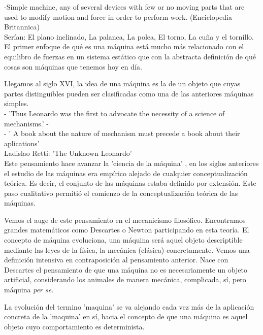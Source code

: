 -Simple machine, any of several devices with few or no moving parts that are used to modify motion and force in order to perform work. (Enciclopedia Britannica) \\


Serían: El plano inclinado, La palanca, La polea, El torno, La cuña y el tornillo. El primer enfoque de qué es una máquina está mucho más relacionado con el equilibro de fuerzas en un sistema estático que con la abstracta definición de qué cosas son máquinas que tenemos hoy en día. 

\vspace{10px}

Llegamos al siglo XVI, la idea de una máquina es la de un objeto que cuyas partes distinguibles pueden ser clasificadas como una de las anteriores máquinas simples. \\

- 'Thus Leonardo was the first to advocate the necessity of a science of mechanisms.' -  \\

- ' A book about the nature of mechanism must precede a book about their aplications' \\

Ladislao Retti: 'The Unknown Leonardo' \\

Este pensamiento hace avanzar la 'ciencia de la máquina' , en los siglos anteriores el estudio de las máquinas era empírico alejado de cualquier conceptualización teórica. Es decir, el conjunto de las máquinas estaba definido por extensión. Este paso cualitativo permitió el comienzo de la conceptualización teórica de las máquinas.

\vspace{10px}

Vemos el auge de este pensamiento en el mecanicismo filosófico. Encontramos grandes matemáticos como Descartes o Newton participando en esta teoría. El concepto de máquina evoluciona, una máquina será aquel objeto descriptible mediante las leyes de la física, la mecánica (clásica) concretamente. Vemos una definición intensiva en contraposición al pensamiento anterior. Nace con Descartes el pensamiento de que una máquina no es necesariamente un objeto artificial, considerando los animales de manera mecánica, complicada, sí, pero máquina \textit{per se}. 


La evolución del termino 'maquina' se va alejando cada vez más de la aplicación concreta de la 'maquina' en sí, hacia el concepto de que una máquina es aquel objeto cuyo comportamiento es determinista. \\

